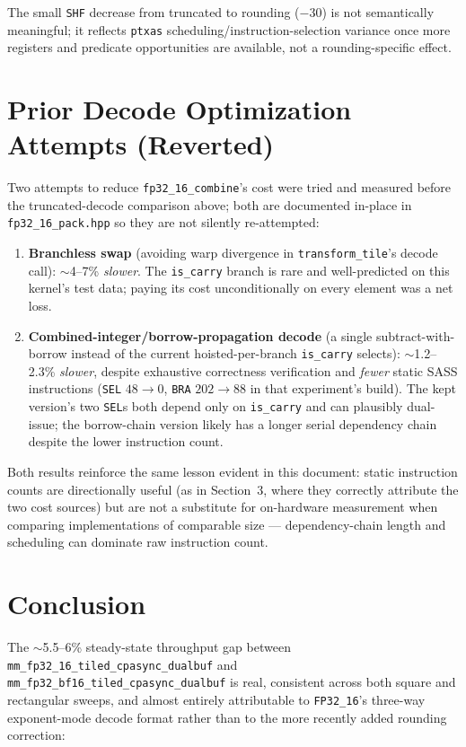 \documentclass[11pt]{article}
\begin{document}
The small \texttt{SHF} decrease from truncated to rounding ($-30$) is not semantically meaningful; it reflects \texttt{ptxas} scheduling/instruction-selection variance once more registers and predicate opportunities are available, not a rounding-specific effect.

\section{Prior Decode Optimization Attempts (Reverted)}

Two attempts to reduce \texttt{fp32\_16\_combine}'s cost were tried and measured before the truncated-decode comparison above; both are documented in-place in \texttt{fp32\_16\_pack.hpp} so they are not silently re-attempted:

\begin{enumerate}
\item \textbf{Branchless swap} (avoiding warp divergence in \texttt{transform\_tile}'s decode call): $\sim$4--7\% \emph{slower}. The \texttt{is\_carry} branch is rare and well-predicted on this kernel's test data; paying its cost unconditionally on every element was a net loss.
\item \textbf{Combined-integer/borrow-propagation decode} (a single subtract-with-borrow instead of the current hoisted-per-branch \texttt{is\_carry} selects): $\sim$1.2--2.3\% \emph{slower}, despite exhaustive correctness verification and \emph{fewer} static SASS instructions (\texttt{SEL} $48\to0$, \texttt{BRA} $202\to88$ in that experiment's build). The kept version's two \texttt{SEL}s both depend only on \texttt{is\_carry} and can plausibly dual-issue; the borrow-chain version likely has a longer serial dependency chain despite the lower instruction count.
\end{enumerate}

Both results reinforce the same lesson evident in this document: static instruction counts are directionally useful (as in Section~3, where they correctly attribute the two cost sources) but are not a substitute for on-hardware measurement when comparing implementations of comparable size --- dependency-chain length and scheduling can dominate raw instruction count.

\section{Conclusion}

The $\sim$5.5--6\% steady-state throughput gap between \texttt{mm\_fp32\_16\_tiled\_cpasync\_dualbuf} and \texttt{mm\_fp32\_bf16\_tiled\_cpasync\_dualbuf} is real, consistent across both square and rectangular sweeps, and almost entirely attributable to \texttt{FP32\_16}'s three-way exponent-mode decode format rather than to the more recently added rounding correction:
\end{document}
